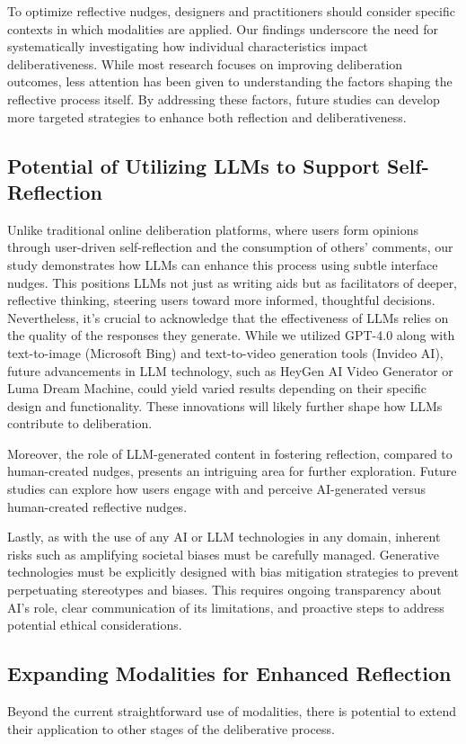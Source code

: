 To optimize reflective nudges, designers and practitioners should consider specific contexts in which modalities are applied. Our findings underscore the need for systematically investigating how individual characteristics impact deliberativeness. While most research focuses on improving deliberation outcomes, less attention has been given to understanding the factors shaping the reflective process itself. By addressing these factors, future studies can develop more targeted strategies to enhance both reflection and deliberativeness.

\subsection{Potential of Utilizing LLMs to Support Self-Reflection}
Unlike traditional online deliberation platforms, where users form opinions through user-driven self-reflection and the consumption of others' comments, our study demonstrates how LLMs can enhance this process using subtle interface nudges. This positions LLMs not just as writing aids but as facilitators of deeper, reflective thinking, steering users toward more informed, thoughtful decisions. Nevertheless, it's crucial to acknowledge that the effectiveness of LLMs relies on the quality of the responses they generate. While we utilized GPT-4.0 along with text-to-image (Microsoft Bing) and text-to-video generation tools (Invideo AI), future advancements in LLM technology, such as HeyGen AI Video Generator or Luma Dream Machine, could yield varied results depending on their specific design and functionality. These innovations will likely further shape how LLMs contribute to deliberation. 

Moreover, the role of LLM-generated content in fostering reflection, compared to human-created nudges, presents an intriguing area for further exploration. Future studies can explore how users engage with and perceive AI-generated versus human-created reflective nudges. 

Lastly, as with the use of any AI or LLM technologies in any domain, inherent risks such as amplifying societal biases must be carefully managed. Generative technologies must be explicitly designed with bias mitigation strategies to prevent perpetuating stereotypes and biases. This requires ongoing transparency about AI's role, clear communication of its limitations, and proactive steps to address potential ethical considerations. 

\subsection{Expanding Modalities for Enhanced Reflection}
Beyond the current straightforward use of modalities, there is potential to extend their application to other stages of the deliberative process.

